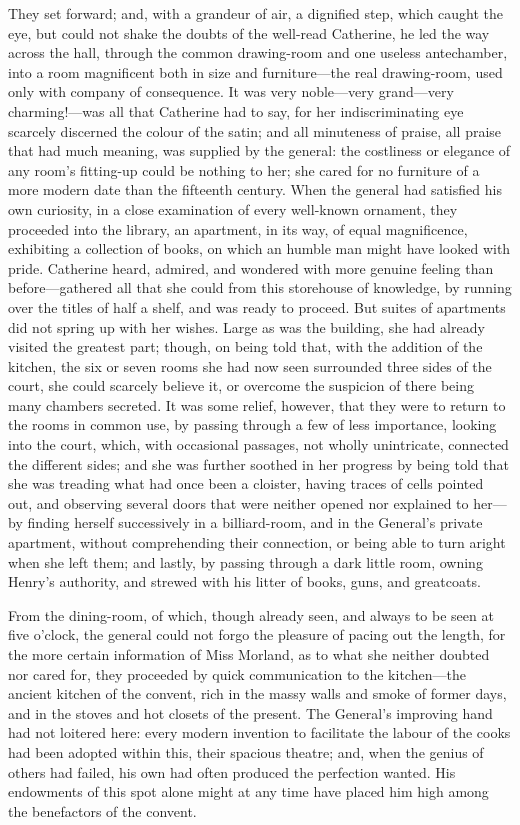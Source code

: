  They set forward; and, with a grandeur of air, a dignified step, which caught the eye, but could not shake the doubts of the well-read Catherine, he led the way across the hall, through the common drawing-room and one useless antechamber, into a room magnificent both in size and furniture—the real drawing-room, used only with company of consequence. It was very noble—very grand—very charming!—was all that Catherine had to say, for her indiscriminating eye scarcely discerned the colour of the satin; and all minuteness of praise, all praise that had much meaning, was supplied by the general: the costliness or elegance of any room's fitting-up could be nothing to her; she cared for no furniture of a more modern date than the fifteenth century. When the general had satisfied his own curiosity, in a close examination of every well-known ornament, they proceeded into the library, an apartment, in its way, of equal magnificence, exhibiting a collection of books, on which an humble man might have looked with pride. Catherine heard, admired, and wondered with more genuine feeling than before—gathered all that she could from this storehouse of knowledge, by running over the titles of half a shelf, and was ready to proceed. But suites of apartments did not spring up with her wishes. Large as was the building, she had already visited the greatest part; though, on being told that, with the addition of the kitchen, the six or seven rooms she had now seen surrounded three sides of the court, she could scarcely believe it, or overcome the suspicion of there being many chambers secreted. It was some relief, however, that they were to return to the rooms in common use, by passing through a few of less importance, looking into the court, which, with occasional passages, not wholly unintricate, connected the different sides; and she was further soothed in her progress by being told that she was treading what had once been a cloister, having traces of cells pointed out, and observing several doors that were neither opened nor explained to her—by finding herself successively in a billiard-room, and in the General's private apartment, without comprehending their connection, or being able to turn aright when she left them; and lastly, by passing through a dark little room, owning Henry's authority, and strewed with his litter of books, guns, and greatcoats. 

 From the dining-room, of which, though already seen, and always to be seen at five o'clock, the general could not forgo the pleasure of pacing out the length, for the more certain information of Miss Morland, as to what she neither doubted nor cared for, they proceeded by quick communication to the kitchen—the ancient kitchen of the convent, rich in the massy walls and smoke of former days, and in the stoves and hot closets of the present. The General's improving hand had not loitered here: every modern invention to facilitate the labour of the cooks had been adopted within this, their spacious theatre; and, when the genius of others had failed, his own had often produced the perfection wanted. His endowments of this spot alone might at any time have placed him high among the benefactors of the convent. 


